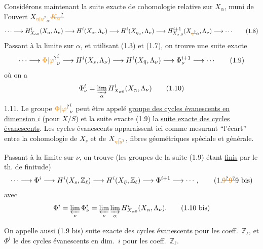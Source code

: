 Considérons maintenant la suite exacte de cohomologie relative sur $X_\alpha$, muni de l'ouvert $X_{{\unsure{\eta|y}}_\alpha}\deleted{\unsure{K_\alpha}}$
\[
\cdots\longrightarrow H^i_{X_{\alpha0}}(X_\alpha,\Lambda_\nu)\longrightarrow H^i(X_\alpha,\Lambda_\nu)\longrightarrow H^i(X_{\eta_\alpha},\Lambda_\nu)\longrightarrow H^{i+1}_{X_{\alpha,0}}(X_{\deleted{\unsure{\eta}}\alpha},\Lambda_\nu)\longrightarrow\cdots
\tag*{(1.8)}
\]
Passant à la limite sur $\alpha$, et utilisant (1.3) et (1.7), on trouve une suite exacte
\[
\cdots\longrightarrow{\unsure{\Phi|\varphi}}^i_\nu\longrightarrow H^i(X_s,\Lambda_\nu)\longrightarrow H^i(X_{\bar\eta},\Lambda_\nu)\longrightarrow\Phi^{i+1}_\nu\longrightarrow\cdots
\tag*{(1.9)}
\]
où on a
\[
\Phi^i_\nu=\varinjlim_\alpha H^i_{X_{\alpha0}}(X_\alpha,\Lambda_\nu)
\tag*{(1.10)}
\]
1.11. Le groupe ${\unsure{\Phi|\varphi}}^i_\nu$ peut être appelé \uline{groupe des cycles évanescents en dimension $i$} (pour $X/S$) et la suite exacte (1.9) la \uline{suite exacte des cycles évanescents}. Les cycles évanescents apparaissent ici comme mesurant ``l'écart'' entre la cohomologie de $X_s$ et de $X_{\bar{\unsure{\eta|y}}}$, fibres géométriques spéciale et générale.

Passant à la limite  sur $\nu$, on trouve (les groupes de la suite (1.9) étant \uline{finis} \unsure{$\ell$)|(!)} par le th. de finitude)
\[
\cdots\longrightarrow\Phi^i\longrightarrow H^i(X_s,\mathbb Z_\ell)\longrightarrow H^i(X_{\bar\eta},\mathbb Z_\ell)\longrightarrow\Phi^{i+1}\longrightarrow\cdots,
\tag*{(1.\deleted{\unsure{9}}\deleted{\unsure{9}}9 bis)}
\]
avec
\[
\Phi^i=\varprojlim_\nu\Phi^i_\nu=\varprojlim_\nu\varinjlim_\alpha H^i_{X_{\alpha0}}(X_\alpha,\Lambda_\nu).
\tag*{(1.10 bis)}
\]

 On appelle aussi (1.9 bis) suite exacte des cycles évanescents pour les coeff.\ $\mathbb Z_\ell$, et $\Phi^i$ le  des cycles évanescents en dim.\ $i$ pour les coeff.\ $\mathbb Z_\ell$.

